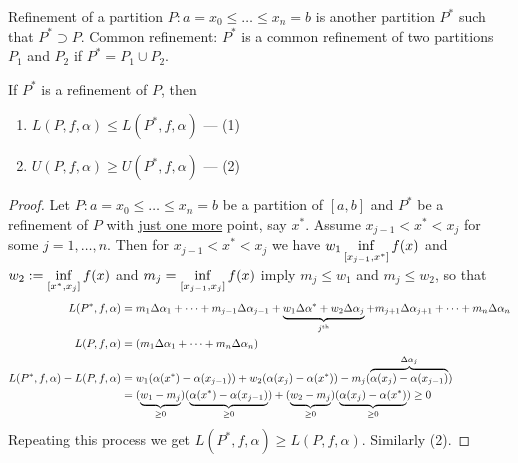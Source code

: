 \documentclass[]{article}
\begin{document}
Refinement of a partition $P:a=x_0\leq \dots\leq x_n=b$ is another partition $P^*$ such that $P^*\supset P$.
Common refinement: $P^*$ is a common refinement of two partitions $P_1$ and $P_2$ if $P^* = P_1\cup P_2$.
\begin{theorem}
	If $P^*$ is a refinement of $P$, then 
	\begin{enumerate}
		\item[] $L(P,f,\alpha) \leq L(P^*,f,\alpha)$ --- (1)
		\item[] $U(P,f,\alpha) \geq U(P^*,f,\alpha)$ --- (2)
	\end{enumerate}
\end{theorem}
\begin{proof}
	Let $P: a=x_0\leq \dots\leq x_n=b$ be a partition of $[a,b]$ and $P^*$ be a refinement of $P$ with \ul{just one more} point, say $x^*$.
	Assume $x_{j-1}<x^*<x_j$ for some $j=1,\dots,n$.
	Then for $x_{j-1}<x^*<x_j$ we have $\ds w_1\inf_{[x_{j-1},x^*]} f(x)$ and $\ds w_2:= \inf_{[x^*,x_j]} f(x)$ and $\ds m_j = \inf_{[x_{j-1},x_j]} f(x)$ imply $m_j\leq w_1$ and $m_j\leq w_2$, so that
	\begin{align*}
		L(P^*,f,\alpha) &= m_1\Delta\alpha_1 + \dots + m_{j-1}\Delta\alpha_{j-1} + \ub{j^\text{th}}{w_1\Delta\alpha^* + w_2\Delta\alpha_j} + m_{j+1}\Delta\alpha_{j+1} + \dots + m_n\Delta\alpha_n \\
		L(P,f,\alpha) &= (m_1\Delta\alpha_1 + \dots + m_n\Delta\alpha_n) \\
		L(P^*,f,\alpha)-L(P,f,\alpha) 
		&= w_1(\alpha(x^*)-\alpha(x_{j-1})) + w_2(\alpha(x_j)-\alpha(x^*)) - m_j(\ob{\Delta\alpha_j}{\alpha(x_j)-\alpha(x_{j-1})}) \\
					  &= (\ub{\geq0}{w_1-m_j})(\ub{\geq0}{\alpha(x^*)-\alpha(x_{j-1})}) + (\ub{\geq0}{w_2-m_j})(\ub{\geq0}{\alpha(x_j)-\alpha(x^*)}) \geq 0
	\end{align*}
	Repeating this process we get $L(P^*,f,\alpha)\geq L(P,f,\alpha)$. Similarly (2).
\end{proof}
\end{document}
